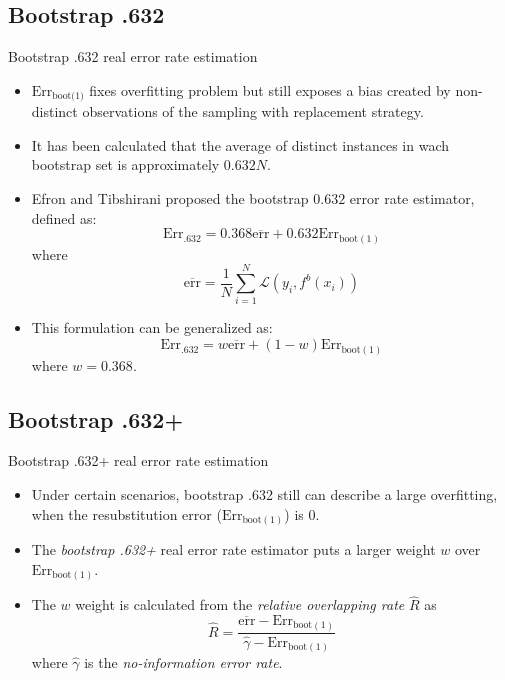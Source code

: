 \documentclass[aspectratio=169,compress,10pt]{beamer}
\begin{document}
\subsection{Bootstrap .632}
\begin{frame}{Bootstrap .632 real error rate estimation}
\begin{itemize}
	\item $\text{Err}_{\text{boot(1)}}$ fixes overfitting problem but still exposes a bias created by non-distinct observations of the sampling with replacement strategy.
	\item It has been calculated that the average of distinct instances in wach bootstrap set is approximately $0.632N$.
	\item Efron and Tibshirani proposed the bootstrap $0.632$ error rate estimator, defined as:
	\begin{equation}
		\text{Err}_{.632} = 0.368 \overline{\text{err}} + 0.632 \text{Err}_{\text{boot}(1)}
		\label{eq:bootstrap}
	\end{equation}
	where
	$$
	\overline{\text{err}} = \frac{1}{N} \sum_{i=1}^{N} \mathcal{L}(y_i,f^b(x_i))
	$$
	\item This formulation can be generalized as:
	\begin{equation}
		\text{Err}_{.632} = w \overline{\text{err}} + (1 - w) \text{Err}_{\text{boot}(1)}
	\end{equation}
	where $w=0.368$.
\end{itemize}
\end{frame}

\subsection{Bootstrap .632+}
\begin{frame}{Bootstrap .632+ real error rate estimation}
\begin{itemize}
	\item Under certain scenarios, bootstrap .632 still can describe a large overfitting, when the resubstitution error ($\text{Err}_{\text{boot}(1)}$) is $0$.
	\item The \emph{bootstrap .632+} real error rate estimator puts a larger weight $w$ over $\text{Err}_{\text{boot}(1)}$.
	\item The $w$ weight is calculated from the \emph{relative overlapping rate} $\hat{R}$ as
	$$
	\hat{R} = \frac{\overline{\text{err}} - \text{Err}_{\text{boot}(1)}}{\hat{\gamma} - \text{Err}_{\text{boot}(1)}}
	$$
	where
	$\hat{\gamma}$ is the \emph{no-information error rate}.
\end{itemize}
\end{frame}
\end{document}
